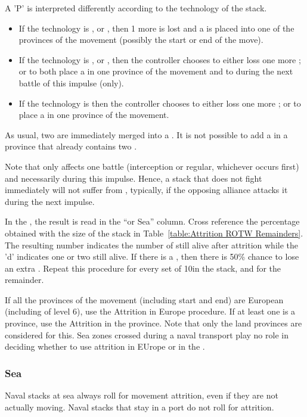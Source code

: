 A 'P' is interpreted differently according to the technology of the stack.
\begin{itemize}
\item If the technology is \TMED, \TREN or \TARQ, then 1 more \LD is lost and
  a \PILLAGE\facemoins is placed into one of the provinces of the movement
  (possibly the start or end of the move).
\item If the technology is \TMUS, \TBAR or \TMAN, then the controller chooses
  to either loss one more \LD; or to both place a \PILLAGE\facemoins in one
  province of the movement and to  during the next battle of
  this impulse (only).
\item If the technology is \TL then the controller chooses
  to either loss one more \LD; or to place a \PILLAGE\facemoins in one
  province of the movement.
\end{itemize}
As usual, two \PILLAGE\Facemoins are immediately merged into a
\PILLAGE\Faceplus. It is not possible to add a \PILLAGE in a province that
already contains two \PILLAGE\Faceplus.

Note that  only affects one battle (interception or regular,
whichever occurs first) and necessarily during this impulse. Hence, a stack
that does not fight immediately will not suffer from ,
typically, if the opposing alliance attacks it during the next impulse.

\smallskip

In the \ROTW, the result is read in the ``\ROTW or Sea'' column. Cross
reference the percentage obtained with the size of the stack in
Table~\ref{table:Attrition ROTW Remainders}. The resulting number indicates
the number of \LD still alive after attrition while the 'd' indicates one or
two \LDE still alive. If there is a \textetoile, then there is 50\% chance to
lose an extra \LDE. Repeat this procedure for every set of 10\LD in the stack,
and for the remainder.

If all the provinces of the movement (including start and end) are European
(including \COL of level 6), use the Attrition in Europe procedure. If at
least one is a \ROTW province, use the Attrition in the \ROTW province. Note
that only the land provinces are considered for this. Sea zones crossed during
a naval transport play no role in deciding whether to use attrition in EUrope
or in the \ROTW.

\subsubsection{Sea}
Naval stacks at sea always roll for movement attrition, even if they are not
actually moving. Naval stacks that stay in a port do not roll for attrition.

